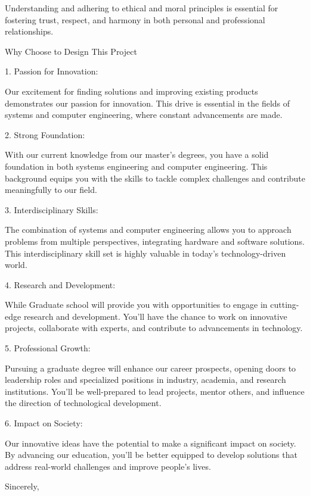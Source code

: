 \documentclass[12pt,letterpaper]{article}
\begin{document}
Understanding and adhering to ethical and moral principles is essential for fostering trust, respect, and harmony in both personal and professional relationships. 







Why Choose to Design This Project

1. Passion for Innovation:

   Our excitement for finding solutions and improving existing products demonstrates our passion for innovation. This drive is essential in the fields of systems and computer engineering, where constant advancements are made.

2. Strong Foundation:

   With our current knowledge from our master's degrees, you have a solid foundation in both systems engineering and computer engineering. This background equips you with the skills to tackle complex challenges and contribute meaningfully to our field.

3. Interdisciplinary Skills:

   The combination of systems and computer engineering allows you to approach problems from multiple perspectives, integrating hardware and software solutions. This interdisciplinary skill set is highly valuable in today's technology-driven world.

4. Research and Development:

   While Graduate school will provide you with opportunities to engage in cutting-edge research and development. You'll have the chance to work on innovative projects, collaborate with experts, and contribute to advancements in technology.

5. Professional Growth:

   Pursuing a graduate degree will enhance our career prospects, opening doors to leadership roles and specialized positions in industry, academia, and research institutions. You'll be well-prepared to lead projects, mentor others, and influence the direction of technological development.

6. Impact on Society:

   Our innovative ideas have the potential to make a significant impact on society. By advancing our education, you'll be better equipped to develop solutions that address real-world challenges and improve people's lives.

 



Sincerely,\\
[Gregory John Allen Banks]\\
[Designer, Architect and Innvovation Engineer]\\
[John Allen's LLC]
\end{document}
